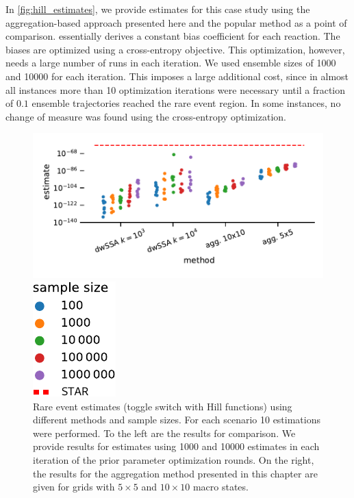In \autoref{fig:hill_estimates}, we provide estimates for this case study using the aggregation-based approach presented here and the popular  method as a point of comparison.
 \parencite{daigle2011automated} essentially derives a constant bias coefficient for each reaction.
The biases are optimized using a cross-entropy objective.
This optimization, however, needs a large number of runs in each iteration.
We used ensemble sizes of \num{1000} and \num{10000} for each iteration.
This imposes a large additional cost, since in almost all instances more than \num{10} optimization iterations were necessary until a fraction of $0.1$ ensemble trajectories reached the rare event region.
In some instances, no change of measure was found using the cross-entropy optimization.
\begin{figure}[htb]
    \centering
    \begin{minipage}{0.77\textwidth}
        \includegraphics[scale=.55]{gfx/hill_estimates.pdf}
    \end{minipage}
    \hspace{1ex}
    \begin{minipage}{0.07\textwidth}
        \includegraphics[scale=.55]{gfx/hill_estimates_legend.pdf}
    \end{minipage}
    \caption[Rare event estimates (toggle switch)]{\label{fig:hill_estimates}Rare event estimates (toggle switch with Hill functions) using different methods and sample sizes. For each scenario \num{10} estimations were performed. To the left are the  results for comparison. We provide results for estimates using \num{1000} and \num{10000} estimates in each iteration of the prior parameter optimization rounds. On the right, the results for the aggregation method presented in this chapter are given for grids with $5\times 5$ and $10\times 10$ macro states.}
\end{figure}

